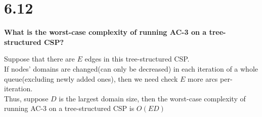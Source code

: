 \documentclass[UTF8]{article}
\begin{document}
\vspace{5em}
\section*{6.12}
\noindent \textbf{What is the worst-case complexity of running AC-3 on a tree-structured CSP?}

\noindent Suppose that there are $E$ edges in this tree-structured CSP.\\
If nodes' domains are changed(can only be decreased) in each iteration of a whole queue(excluding newly added ones), then we need check $E$ more arcs per-iteration.\\
Thus, suppose $D$ is the largest domain size, then the worst-case complexity of running AC-3 on a tree-structured CSP is $O(ED)$
\end{document}
